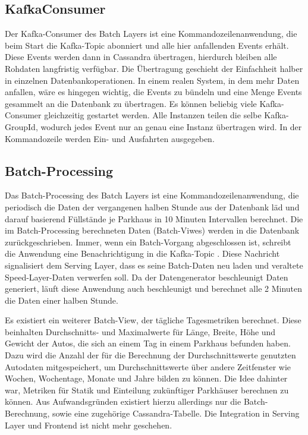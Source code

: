\subsection{KafkaConsumer}
Der Kafka-Consumer des Batch Layers ist eine Kommandozeilenanwendung, die beim Start die Kafka-Topic  abonniert und alle hier anfallenden Events erhält.
Diese Events werden dann in Cassandra übertragen, hierdurch bleiben alle Rohdaten langfristig verfügbar.
Die Übertragung geschieht der Einfachheit halber in einzelnen Datenbankoperationen.
In einem realen System, in dem mehr Daten anfallen, wäre es hingegen wichtig, die Events zu bündeln und eine Menge Events gesammelt an die Datenbank zu übertragen.
Es können beliebig viele Kafka-Consumer gleichzeitig gestartet werden.
Alle Instanzen teilen die selbe Kafka-GroupId, wodurch jedes Event nur an genau eine Instanz übertragen wird.
In der Kommandozeile werden Ein- und Ausfahrten ausgegeben.

\subsection{Batch-Processing}
Das Batch-Processing des Batch Layers ist eine Kommandozeilenanwendung, die periodisch die Daten der vergangenen halben Stunde aus der Datenbank läd und darauf basierend Füllstände je Parkhaus in 10 Minuten Intervallen berechnet.
Die im Batch-Processing berechneten Daten (Batch-Viwes) werden in die Datenbank zurückgeschrieben.
Immer, wenn ein Batch-Vorgang abgeschlossen ist, schreibt die Anwendung eine Benachrichtigung in die Kafka-Topic .
Diese Nachricht signalisiert dem Serving Layer, dass es seine Batch-Daten neu laden und veraltete Speed-Layer-Daten verwerfen soll.
Da der Datengenerator beschleunigt Daten generiert, läuft diese Anwendung auch beschleunigt und berechnet alle 2 Minuten die Daten einer halben Stunde.

Es existiert ein weiterer Batch-View, der tägliche Tagesmetriken berechnet.
Diese beinhalten Durchschnitts- und Maximalwerte für Länge, Breite, Höhe und Gewicht der Autos, die sich an einem Tag in einem Parkhaus befunden haben.
Dazu wird die Anzahl der für die Berechnung der Durchschnittswerte genutzten Autodaten mitgespeichert, um Durchschnittswerte über andere Zeitfenster wie Wochen, Wochentage, Monate und Jahre bilden zu können.
Die Idee dahinter war, Metriken für Statik und Einteilung zukünftiger Parkhäuser berechnen zu können.
Aus Aufwandsgründen existiert hierzu allerdings nur die Batch-Berechnung, sowie eine zugehörige Cassandra-Tabelle.
Die Integration in Serving Layer und Frontend ist nicht mehr geschehen.

